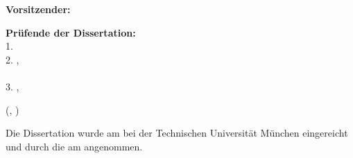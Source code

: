 \begin{titlepage}
\begin{textblock*}{}
        \textbf{Vorsitzender:}\\
        \hspace{8mm}\hphantom{1. } \chairman{}

        \vspace{2mm}

        \textbf{Pr\"ufende der Dissertation:}\\
        \hspace{8mm}1. \supervisorA{}\\
        \hspace{8mm}2. \supervisorB{}
          ,\\\hspace{8mm}\hphantom{2. }\supervisorBuni{}\\
          \hspace{8mm}3. \supervisorC{}
          ,\\\hspace{8mm}\hphantom{3. }\supervisorCuni
%


    \end{textblock*}



    \begin{textblock*}{}(, \datevpos)
        \raggedright

        Die Dissertation wurde am \subdate{} bei der Technischen Universit\"at
        M\"unchen eingereicht und durch die {\facultyger{}}
          am \accdate{}
        angenommen.

    \end{textblock*}

\end{titlepage}

\mbox{}
\newpage
\thispagestyle{empty}
\mbox{}
\newpage

\thispagestyle{empty}

%
%
